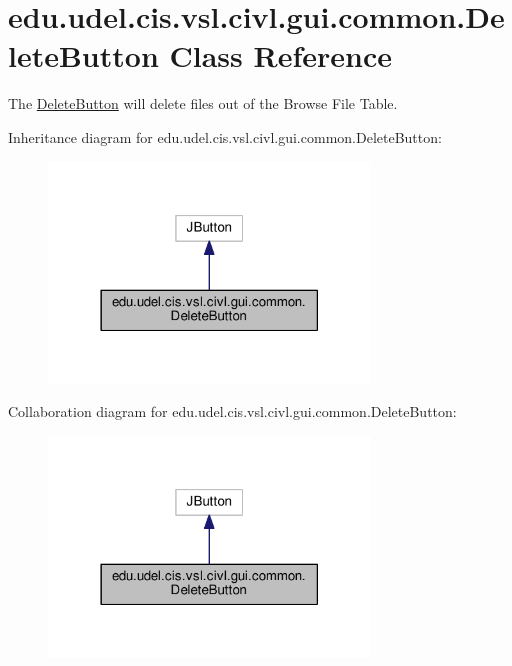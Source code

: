\hypertarget{classedu_1_1udel_1_1cis_1_1vsl_1_1civl_1_1gui_1_1common_1_1DeleteButton}{}\section{edu.\+udel.\+cis.\+vsl.\+civl.\+gui.\+common.\+Delete\+Button Class Reference}
\label{classedu_1_1udel_1_1cis_1_1vsl_1_1civl_1_1gui_1_1common_1_1DeleteButton}


The \hyperlink{classedu_1_1udel_1_1cis_1_1vsl_1_1civl_1_1gui_1_1common_1_1DeleteButton}{Delete\+Button} will delete files out of the Browse File Table.  




Inheritance diagram for edu.\+udel.\+cis.\+vsl.\+civl.\+gui.\+common.\+Delete\+Button\+:
\nopagebreak
\begin{figure}[H]
\begin{center}
\leavevmode
\includegraphics[width=242pt]{classedu_1_1udel_1_1cis_1_1vsl_1_1civl_1_1gui_1_1common_1_1DeleteButton__inherit__graph}
\end{center}
\end{figure}


Collaboration diagram for edu.\+udel.\+cis.\+vsl.\+civl.\+gui.\+common.\+Delete\+Button\+:
\nopagebreak
\begin{figure}[H]
\begin{center}
\leavevmode
\includegraphics[width=242pt]{classedu_1_1udel_1_1cis_1_1vsl_1_1civl_1_1gui_1_1common_1_1DeleteButton__coll__graph}
\end{center}
\end{figure}
